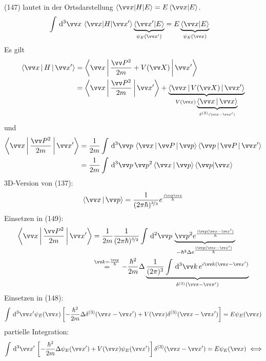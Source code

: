 \documentclass[a4paper]{scrartcl}
\newcommand{\dd}{\ensuremath \, \mathrm{d}}
\begin{document}
{(147) lautet in der Ortsdarstellung $\braket{ \vv x | H | E} = E \braket{ \vv x | E}$.
\begin{align}
\int \dd^3 \vv x \, \braket{ \vv x | H | \vv x'} \underbrace{ \braket{\vv x ' | E}}_{\psi_E(\vv x')} & = E \underbrace{ \braket{ \vv x | E}}_{\psi_E(\vv x)}
\end{align}
Es gilt
\begin{align*}
\Braket{ \vv x | H | \vv x'} & = \Braket{ \vv x| \frac{ \vv P^2}{2m} + V( \vv X) | \vv x'} \\
& = \Braket{ \vv x | \frac{ \vv P^2}{2m} | \vv x'} + \underbrace{\Braket{ \vv x | V(\vv X) | \vv x'}}_{V(\vv x) \underbrace{\Braket{ \vv x | \vv x }}_{\delta^{(3)}(\vv x - \vv x')}}
\end{align*}
und
\begin{align}
\begin{split}
\Braket{ \vv x | \frac{ \vv P^2}{2m} | \vv x'} & = \frac1{2m} \int \dd^3 \vv p \, \Braket{ \vv x | \vv P | \vv p }\Braket{ \vv p | \vv P | \vv x'} \\
& = \frac1{2m} \int \dd^3 \vv p \, \vv p^2 \Braket{ \vv x | \vv p }\braket{ \vv p | \vv x}
\end{split}
\end{align}
3D-Version von (137):
\begin{align} 
\Braket{ \vv x | \vv p } = \frac1{(2 \pi \hbar)^{\nicefrac32}} e^{\frac{i \vv p \vv x}{\hbar}}
\end{align}
Einsetzen in (149):
\begin{align}
\begin{split}
\Braket{ \vv x | \frac{ \vv P^2}{2m} | \vv x' } & = \frac1{2m} \frac1{(2\pi \hbar)^{\nicefrac32}} \int \dd^2 \vv p \, \underbrace{ \vv p^2 e^{\frac{ i \vv p ( \vv x  - \vv x')} \hbar}}_{- \hbar^2 \Delta e^{\frac{i \vv p ( \vv x - \vv x')}\hbar}} \\
& \stackrel{ \vv k = \frac{\vv p}{\hbar}}=  - \frac{\hbar^2}{2m} \Delta\underbrace{ \frac1{(2\pi)^3} \int \dd^3 \vv k \, e^{i \vv k ( \vv x - \vv x')}}_{\delta^{(3)}(\vv x - \vv x')}
\end{split}
\end{align}
Einsetzen in (148):
$$\int \dd^3 \vv x' \psi_E(\vv x) \left[ - \frac{\hbar^2}{2m} \Delta \delta^{(3)} (\vv x - \vv x') + V( \vv x) \delta^{(3)} (\vv x - \vv x') \right] = E \psi_E(\vv x)$$
partielle Integration:
\begin{align}
\int \dd^3 \vv x' \, \left[ - \frac{\hbar^2}{2m} \Delta \psi_E( \vv x') + V(\vv x) \psi_E(\vv x') \right] \delta^{(3)}(\vv x - \vv x') & = E \psi_E(\vv x) \ \Longleftrightarrow \notag \\

\end{align}}
\end{document}
